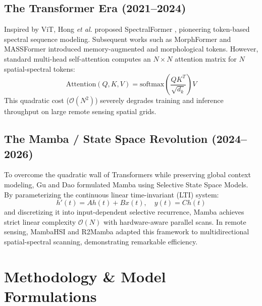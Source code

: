 \documentclass[conference]{IEEEtran}
\begin{document}
\subsection{The Transformer Era (2021--2024)}
Inspired by ViT, Hong \textit{et al.} proposed SpectralFormer \cite{spectralformer}, pioneering token-based spectral sequence modeling. Subsequent works such as MorphFormer and MASSFormer introduced memory-augmented and morphological tokens. However, standard multi-head self-attention computes an $N \times N$ attention matrix for $N$ spatial-spectral tokens:
\begin{equation}
\text{Attention}(Q, K, V) = \text{softmax}\left(\frac{QK^T}{\sqrt{d_k}}\right)V
\end{equation}
This quadratic cost ($\mathcal{O}(N^2)$) severely degrades training and inference throughput on large remote sensing spatial grids.

\subsection{The Mamba / State Space Revolution (2024--2026)}
To overcome the quadratic wall of Transformers while preserving global context modeling, Gu and Dao formulated Mamba \cite{mamba} using Selective State Space Models. By parameterizing the continuous linear time-invariant (LTI) system:
\begin{equation}
h'(t) = Ah(t) + Bx(t), \quad y(t) = Ch(t)
\end{equation}
and discretizing it into input-dependent selective recurrence, Mamba achieves strict linear complexity $\mathcal{O}(N)$ with hardware-aware parallel scans. In remote sensing, MambaHSI and R2Mamba \cite{r2mamba} adapted this framework to multidirectional spatial-spectral scanning, demonstrating remarkable efficiency.

\section{Methodology \& Model Formulations}
\end{document}
